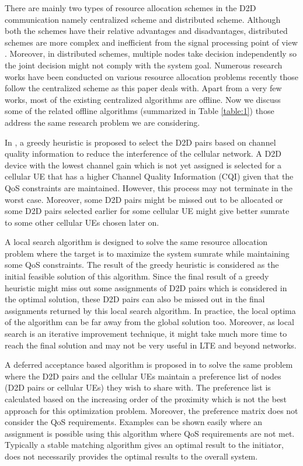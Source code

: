\documentclass[times]{dacauth}
\begin{document}
\smallskip
\noindent
There are mainly two types of resource allocation schemes in the D2D communication namely centralized scheme and distributed scheme. Although both the schemes have their relative advantages and disadvantages, distributed schemes are more complex and inefficient from the signal processing point of view \cite{asadi2014survey}. Moreover, in distributed schemes, multiple nodes take decision independently so the joint decision might not comply with the system goal. Numerous research works have been conducted on various resource allocation problems recently those follow the centralized scheme as this paper deals with. Apart from a very few works, most of the existing centralized algorithms are offline. Now we discuss some of the related offline algorithms (summarized in Table \ref{table:1}) those address the same research problem we are considering.

\smallskip
\noindent
In \cite{zulhasnine}, a greedy heuristic is proposed to select the D2D pairs based on channel quality information to reduce the interference of the cellular network. A D2D device with the lowest channel gain which is not yet assigned is selected for a cellular UE that has a higher Channel Quality Information (CQI) given that the QoS constraints are maintained. However, this process may not terminate in the worst case. Moreover, some D2D pairs might be missed out to be allocated or some D2D pairs selected earlier for some cellular UE might give better sumrate to some other cellular UEs chosen later on. 

\smallskip
\noindent
A local search algorithm \cite{lora} is designed to solve the same resource allocation problem where the target is to maximize the system sumrate while maintaining some QoS constraints. The result of the greedy heuristic \cite{zulhasnine} is considered as the initial feasible solution of this algorithm. Since the final result of a greedy heuristic might miss out some assignments of D2D pairs which is considered in the optimal solution, these D2D pairs can also be missed out in the final assignments returned by this local search algorithm. In practice, the local optima of the algorithm can be far away from the global solution too. Moreover, as local search is an iterative improvement technique, it might take much more time to reach the final solution and may not be very useful in LTE and beyond networks.

\smallskip
\noindent
A deferred acceptance based algorithm is proposed in \cite{dara} to solve the same problem where the D2D pairs and the cellular UEs maintain a preference list of nodes (D2D pairs or cellular UEs) they wish to share with. The preference list is calculated based on the increasing order of the proximity which is not the best approach for this optimization problem. Moreover, the preference matrix does not consider the QoS requirements. Examples can be shown easily where an assignment is possible using this algorithm where QoS requirements are not met. Typically a stable matching algorithm \cite{stable} gives an optimal result to the initiator, does not necessarily provides the optimal results to the overall system. 
\end{document}
